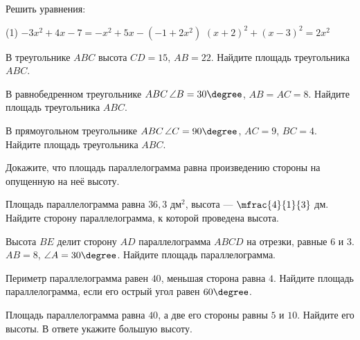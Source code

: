 \begin{class}[number=5]
	\begin{listofex}
		\item Решить уравнения:
		\begin{tasks}(1)
			\task \( -3x^2+4x-7=-x^2+5x-(-1+2x^2) \)
			\task \( (x+2)^2+(x-3)^2=2x^2 \)
		\end{tasks}
		\item В треугольнике \( ABC \) высота \( CD=15 \), \( AB=22 \). Найдите площадь треугольника \( ABC \).
		\item В равнобедренном треугольнике \( ABC \, \angle B=30\degree \), \( AB=AC=8 \). Найдите площадь треугольника \( ABC \).
		\item В прямоугольном треугольнике \( ABC \, \angle C=90\degree\), \( AC=9 \), \( BC=4 \). Найдите площадь треугольника \( ABC \).
		\item Докажите, что площадь параллелограмма равна произведению стороны на опущенную на неё высоту.
		\item Площадь параллелограмма равна \( 36,3 \) дм\( ^2 \), высота --- \( \mfrac{4}{1}{3} \) дм. Найдите сторону параллелограмма, к которой проведена высота.
		\item Высота \( BE \) делит сторону \( AD \) параллелограмма \( ABCD \) на отрезки, равные \( 6 \) и \( 3 \). \( AB=8 \), \( \angle A=30\degree \). Найдите площадь параллелограмма.
		\item Периметр параллелограмма равен \( 40 \), меньшая сторона равна \( 4 \). Найдите площадь параллелограмма, если его острый угол равен \( 60\degree \).
		\item Площадь параллелограмма равна \( 40 \), а две его стороны равны \( 5 \) и \( 10 \). Найдите его высоты. В ответе укажите большую высоту.
		
	\end{listofex}
\end{class}

